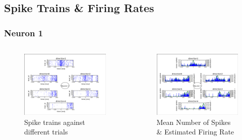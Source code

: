 \documentclass{beamer}
\begin{document}
\subsection{Spike Trains \& Firing Rates}
\begin{frame}\frametitle{Neuron 1}
\begin{columns}
 \begin{column}{5cm}
  \begin{figure}
   \includegraphics[scale=0.25]{fig/neuron1spikes.png}
   \caption{Spike trains against different trials}
  \end{figure}
 \end{column}
 \begin{column}{5cm}
  \begin{figure}
   \includegraphics[scale=0.25]{fig/neuron1rates}
   \caption{Mean Number of Spikes \& Estimated Firing Rate}
  \end{figure}
 \end{column}
\end{columns}
\end{frame}
\end{document}
